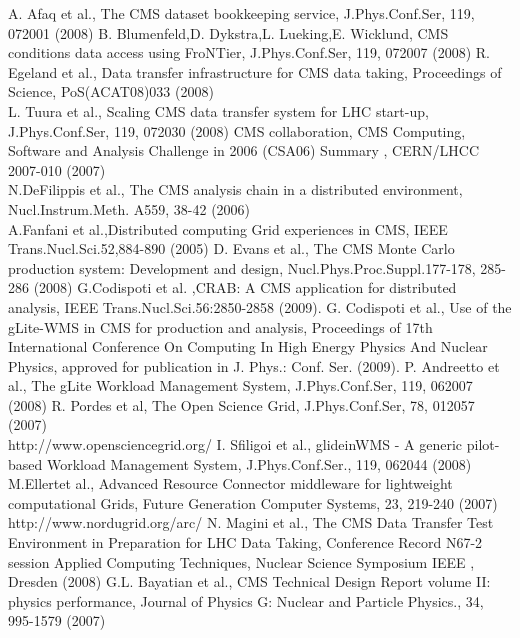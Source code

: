 \begin{thebibliography}{}
%
A. Afaq et al., The CMS dataset bookkeeping service, J.Phys.Conf.Ser, 119, 072001 (2008)
%
B. Blumenfeld,D. Dykstra,L. Lueking,E. Wicklund, CMS conditions data access using FroNTier, J.Phys.Conf.Ser, 119, 072007 (2008)
%
R. Egeland et al., Data transfer infrastructure for CMS data taking, Proceedings of Science, PoS(ACAT08)033 (2008)\\
L. Tuura et al., Scaling CMS data transfer system for LHC start-up, J.Phys.Conf.Ser, 119, 072030 (2008)
%
CMS collaboration,  CMS Computing, Software and Analysis Challenge in 2006 (CSA06) Summary , %
CERN/LHCC 2007-010 (2007) \\
N.DeFilippis et al., The CMS analysis chain in a distributed environment, Nucl.Instrum.Meth. A559, 38-42 (2006) \\
A.Fanfani et al.,Distributed computing Grid experiences in CMS, IEEE Trans.Nucl.Sci.52,884-890 (2005)
%
D. Evans et al., The CMS Monte Carlo production system: Development and design, Nucl.Phys.Proc.Suppl.177-178, 285-286 (2008)
%
G.Codispoti et al. ,CRAB: A CMS application for distributed analysis, IEEE Trans.Nucl.Sci.56:2850-2858 (2009). 
%
G. Codispoti et al., Use of the gLite-WMS in CMS for production and analysis, Proceedings of 17th International Conference On Computing In High Energy Physics And Nuclear Physics, approved for publication in J. Phys.: Conf. Ser. (2009). 
%
P. Andreetto et al., The gLite Workload Management System, J.Phys.Conf.Ser, 119, 062007 (2008)
%
 R. Pordes et al, The Open Science Grid, J.Phys.Conf.Ser, 78, 012057 (2007) \\
http://www.opensciencegrid.org/
%
 I. Sfiligoi et al., glideinWMS - A generic pilot-based Workload Management System, J.Phys.Conf.Ser., 119, 062044 (2008)
%
 M.Ellertet al., Advanced Resource Connector middleware
  for lightweight computational Grids, Future Generation Computer Systems, 23, 219-240 (2007)\\
http://www.nordugrid.org/arc/
%
 N. Magini et al., The CMS Data Transfer Test Environment in Preparation for LHC Data Taking, Conference Record N67-2 session Applied Computing Techniques, Nuclear Science Symposium IEEE , Dresden (2008)
%
 G.L. Bayatian et al., CMS Technical Design Report volume II: physics performance, Journal of Physics G: Nuclear and Particle Physics., 34, 995-1579 (2007)
%


\end{thebibliography}
